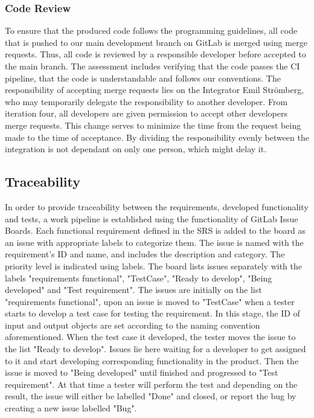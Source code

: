 \documentclass{article}
\begin{document}
	\subsubsection{Code Review}
	To ensure that the produced code follows the programming guidelines, all code that is pushed to our main development branch on GitLab is merged using merge requests. Thus, all code is reviewed by a responsible developer before accepted to the main branch. The assessment includes verifying that the code passes the CI pipeline, that the code is understandable and follows our conventions. The responsibility of accepting merge requests lies on the Integrator Emil Strömberg, who may temporarily delegate the responsibility to another developer. From iteration four, all developers are given permission to accept other developers merge requests. This change serves to minimize the time from the request being made to the time of acceptance. By dividing the responsibility evenly between the integration is not dependant on only one person, which might delay it.
	
	\subsection{Traceability} \label{traceability}
	In order to provide traceability between the requirements, developed functionality and tests, a work pipeline is established using the functionality of GitLab Issue Boards. Each functional requirement defined in the SRS is added to the board as an issue with appropriate labels to categorize them. The issue is named with the requirement's ID and name, and includes the description and category. The priority level is indicated using labels. The board lists issues separately with the labels "requirements functional", "TestCase", "Ready to develop", "Being developed" and "Test requirement". The issues are initially on the list "requirements functional", upon an issue is moved to "TestCase" when a tester starts to develop a test case for testing the requirement. In this stage, the ID of input and output objects are set according to the naming convention aforementioned. When the test case it developed, the tester moves the issue to the list "Ready to develop". Issues lie here waiting for a developer to get assigned to it and start developing corresponding functionality in the product. Then the issue is moved to "Being developed" until finished and progressed to "Test requirement". At that time a tester will perform the test and depending on the result, the issue will either be labelled "Done" and closed, or report the bug by creating a new issue labelled "Bug".
	
\end{document}
